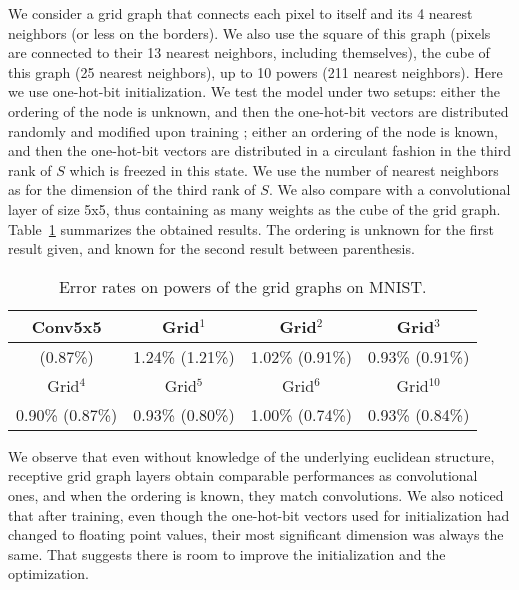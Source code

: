 We consider a grid graph that connects each pixel to itself and its 4 nearest neighbors (or less on the borders). We also use the square of this graph (pixels are connected to their 13 nearest neighbors, including themselves), the cube of this graph (25 nearest neighbors), up to 10 powers (211 nearest neighbors).
Here we use one-hot-bit initialization. We test the model under two setups: either the ordering of the node is unknown, and then the one-hot-bit vectors are distributed randomly and modified upon training ; either an ordering of the node is known, and then the one-hot-bit vectors are distributed in a circulant fashion in the third rank of $S$ which is freezed in this state. We use the number of nearest neighbors as for the dimension of the third rank of $S$.
We also compare with a convolutional layer of size 5x5, thus containing as many weights as the cube of the grid graph. Table~\ref{toy} summarizes the obtained results. The ordering is unknown for the first result given, and known for the second result between parenthesis.

\begin{table}[H]
  \caption{Error rates on powers of the grid graphs on MNIST.}
  \begin{center}
    \bgroup
    \def\arraystretch{1.5}%
    \begin{tabular}{|c|c|c|c|}
      \hline
      Conv5x5 & Grid$^1$ & Grid$^2$ & Grid$^3$\\
      \hline
      (0.87\%) & 1.24\% (1.21\%) & 1.02\% (0.91\%) & 0.93\% (0.91\%)\\
      \hline
      \hline
      Grid$^4$ & Grid$^5$ & Grid$^6$ & Grid$^{10}$\\
      \hline
      0.90\% (0.87\%) & 0.93\% (0.80\%) & 1.00\% (0.74\%) & 0.93\% (0.84\%)\\
      \hline
    \end{tabular}
    \egroup
  \end{center}
  \label{toy}
\end{table}

We observe that even without knowledge of the underlying euclidean structure, receptive grid graph layers obtain comparable performances as convolutional ones, and when the ordering is known, they match convolutions. We also noticed that after training, even though the one-hot-bit vectors used for initialization had changed  to floating point values, their most significant dimension was always the same. That suggests there is room to improve the initialization and the optimization.

